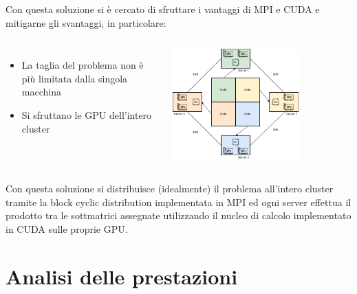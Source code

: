 \documentclass[compress]{beamer}
\begin{document}
\begin{frame}{\secname}
    Con questa soluzione si è cercato di sfruttare i vantaggi di MPI e CUDA e mitigarne gli svantaggi, in particolare:
    \begin{columns}
            \begin{itemize}
                \item La taglia del problema non è più limitata dalla singola macchina
                \item Si sfruttano le GPU dell'intero cluster
            \end{itemize}
        \begin{minipage}[b]{1\textwidth}
            \begin{adjustbox}{margin=0cm 0.3cm 0cm 0cm, center} %
                \includegraphics[width=0.7\textwidth]{resources/mpi_cuda_adjusted.png}
            \end{adjustbox}
        \end{minipage}
    \end{columns}
    Con questa soluzione si distribuisce (idealmente) il problema all'intero cluster tramite la block cyclic distribution implementata in MPI ed ogni server effettua il prodotto tra le sottmatrici assegnate utilizzando il nucleo di calcolo implementato in CUDA sulle proprie GPU.
\end{frame}

\section{Analisi delle prestazioni}
\end{document}
